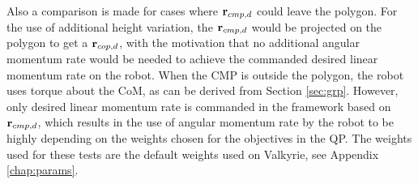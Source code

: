 Also a comparison is made for cases where $\mathbf{r}_{cmp,d}$ could leave the polygon. For the use of additional height variation, the $\mathbf{r}_{cmp,d}$ would be projected on the polygon to get a $\mathbf{r}_{cop,d}$, with the motivation that no additional angular momentum rate would be needed to achieve the commanded desired linear momentum rate on the robot. When the \ac{CMP} is outside the polygon, the robot uses torque about the \ac{CoM}, as can be derived from Section \ref{sec:grp}. However, only desired linear momentum rate is commanded in the framework based on $\mathbf{r}_{cmp,d}$, which results in the use of angular momentum rate by the robot to be highly depending on the weights chosen for the objectives in the \ac{QP}. The weights used for these tests are the default weights used on Valkyrie, see Appendix \ref{chap:params}.
